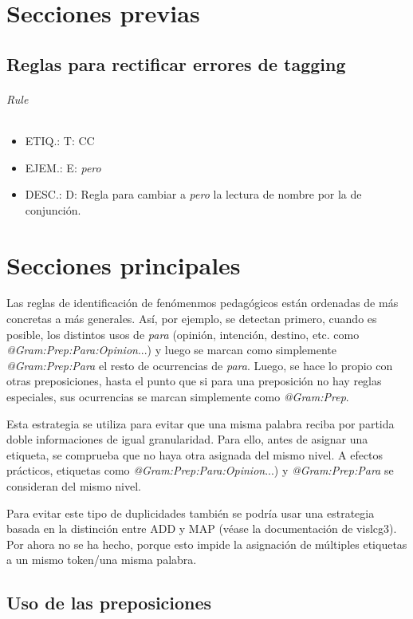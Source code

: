 \documentclass[11pt]{report}
\begin{document}
\part{Secciones previas}
\chapter{Reglas para rectificar errores de tagging}
\paragraph*{Rule}
\begin{itemize}
\item ETIQ.:  T: CC
\item EJEM.:  E: \emph{pero} 
\item DESC.:  D: Regla para cambiar a \emph{pero} la lectura de nombre por la de conjunción.
\end{itemize}

\part{Secciones principales}
Las reglas de identificación de fenómenmos pedagógicos están ordenadas de más concretas a más generales. Así, por ejemplo, se detectan primero, cuando es posible, los distintos usos de \emph{para} (opinión, intención, destino, etc. como \emph{@Gram:Prep:Para:Opinion}...) y luego se marcan como simplemente \emph{@Gram:Prep:Para} el resto de ocurrencias de \emph{para}. Luego, se hace lo propio con otras preposiciones, hasta el punto que si para una preposición no hay reglas especiales, sus ocurrencias se marcan simplemente como \emph{@Gram:Prep}.

Esta estrategia se utiliza para evitar que una misma palabra reciba por partida doble informaciones de igual granularidad. Para ello, antes de asignar una etiqueta, se comprueba que no haya otra asignada del mismo nivel. A efectos prácticos, etiquetas como \emph{@Gram:Prep:Para:Opinion}...) y \emph{@Gram:Prep:Para} se consideran del mismo nivel.

Para evitar este tipo de duplicidades también se podría usar una estrategia basada en la distinción entre ADD y MAP (véase la documentación de vislcg3). Por ahora no se ha hecho, porque esto impide la asignación de múltiples etiquetas a un mismo token/una misma palabra.

\chapter{Uso de las preposiciones}
\end{document}
